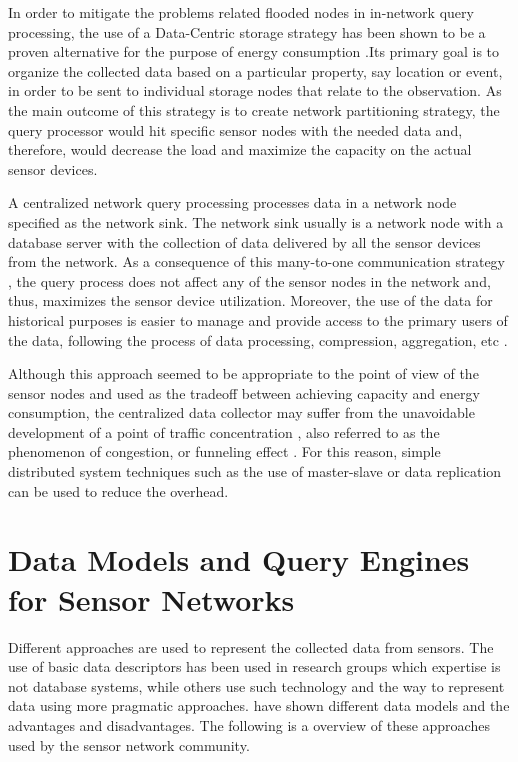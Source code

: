 In order to mitigate the problems related flooded nodes in in-network query
processing, the use of a Data-Centric storage strategy has been shown to be a
proven alternative for the purpose of energy consumption
\cite{sn-storage03, sn-storage01}.Its primary goal is to organize the
collected data based on a particular property, say location or event, in order
to be sent to individual storage nodes that relate to the observation. As the
main outcome of this strategy is to create network partitioning strategy, the
query processor would hit specific sensor nodes with the needed data and,
therefore, would decrease the load and maximize the capacity on the actual
sensor devices.

A centralized network query processing processes data in a network node
specified as the network sink. The network sink usually is a network node with
a database server with the collection of data delivered by all the sensor
devices from the network. As a consequence of this many-to-one communication
strategy \cite{sn-storage02}, the query process does not affect any of the
sensor nodes in the network and, thus, maximizes the sensor device
utilization. Moreover, the use of the data for historical purposes is easier
to manage and provide access to the primary users of the data, following the
process of data processing, compression, aggregation, etc
\cite{sn-db-modeling02}.

Although this approach seemed to be appropriate to the point of view of the
sensor nodes and used as the tradeoff between achieving capacity and energy
consumption, the centralized data collector may suffer from the unavoidable
development of a point of traffic concentration \cite{sn-storage02}, also
referred to as the phenomenon of congestion, or funneling effect
\cite{sn-storage04}. For this reason, simple distributed system techniques
such as the use of master-slave or data replication can be used to reduce the
overhead.

\section{Data Models and Query Engines for Sensor Networks}
\label{sec:data-models}

Different approaches are used to represent the collected data from sensors. The
use of basic data descriptors has been used in research groups which expertise
is not database systems, while others use such technology and the way to
represent data using more pragmatic approaches. \cite{sn-data-model-survey}
have shown different data models and the advantages and disadvantages. The 
following is a overview of these approaches used by the sensor network
community.

